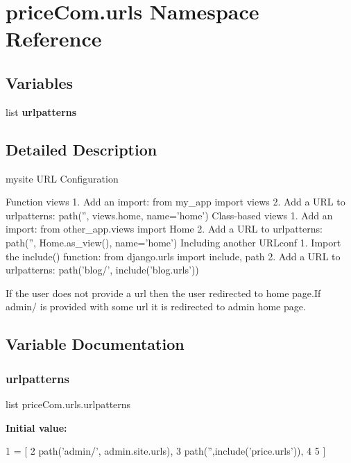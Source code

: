 \hypertarget{namespacepriceCom_1_1urls}{}\section{price\+Com.\+urls Namespace Reference}
\label{namespacepriceCom_1_1urls}
\subsection*{Variables}
\begin{DoxyCompactItemize}
\item 
list {\bfseries urlpatterns}
\end{DoxyCompactItemize}


\subsection{Detailed Description}
\begin{DoxyVerb}mysite URL Configuration

Function views
1. Add an import:  from my_app import views
2. Add a URL to urlpatterns:  path('', views.home, name='home')
Class-based views
1. Add an import:  from other_app.views import Home
2. Add a URL to urlpatterns:  path('', Home.as_view(), name='home')
Including another URLconf
1. Import the include() function: from django.urls import include, path
2. Add a URL to urlpatterns:  path('blog/', include('blog.urls'))

If the user does not provide a url then the user redirected to home page.If admin/ is provided with some url it is redirected to admin home page.\end{DoxyVerb}
 

\subsection{Variable Documentation}
\mbox{\label{namespacepriceCom_1_1urls_a042280c5189e4c6a89b386a3f9a425d2}} 
\subsubsection{\texorpdfstring{urlpatterns}{urlpatterns}}
{\footnotesize\ttfamily list price\+Com.\+urls.\+urlpatterns}

{\bfseries Initial value\+:}
\begin{DoxyCode}
1 =  [
2     path(\textcolor{stringliteral}{'admin/'}, admin.site.urls),
3     path(\textcolor{stringliteral}{''},include(\textcolor{stringliteral}{'price.urls'})),
4         
5 ]
\end{DoxyCode}
